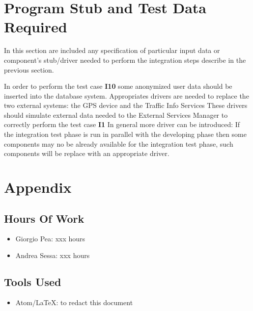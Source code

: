 \documentclass[11pt,titlepage]{article} %
\begin{document}
\section{Program Stub and Test Data Required}
  In this section are included any specification of particular input data or component's stub/driver needed to 
  perform the integration steps describe in the previous section.\newline
  
  \noindent In order to perform the test case \textbf{I10} some anonymized user data should be inserted into the database system.\newline
  Appropriates drivers are needed to replace the two external systems: the GPS device and the Traffic Info Services
  These drivers should simulate external data needed to the External Services Manager to correctly perform the test case \textbf{I1} \newline
  In general more driver can be introduced: If the integration test phase is run in parallel with the developing phase then some components may no
  be already available for the integration test phase, such components will be replace with an appropriate driver.
  
  
\newpage
\section{Appendix}
  \subsection{Hours Of Work}
    \begin{itemize}
     \item Giorgio Pea: xxx hours
     \item Andrea Sessa: xxx hours
    \end{itemize}

  \subsection{Tools Used}
    \begin{itemize}
     \item  Atom/\LaTeX: to redact this document
    \end{itemize}
\end{document}
